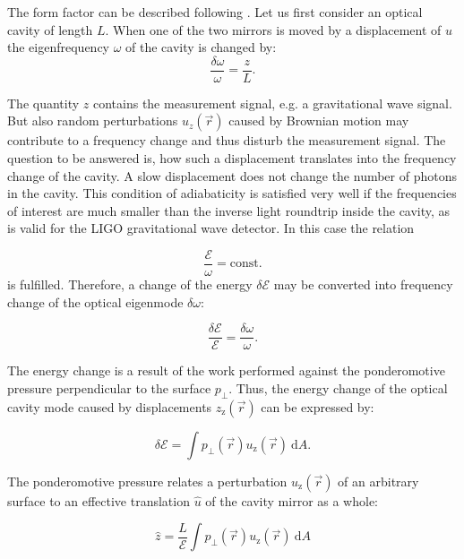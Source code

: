 \documentclass[twocolumn,secnumarabic,amssymb, nobibnotes, aps, prd, showpacs]{revtex4-1}
\begin{document}
\noindent The form factor can be described following \cite{Dem2015, Tug2017}. Let us first consider an optical cavity of length $L$. When one of the two mirrors is moved by a displacement of $u$ the eigenfrequency $\omega$ of the cavity is changed by: 
\begin{equation}
\frac{\delta \omega}{\omega}=\frac{z}{L}.
\end{equation}

\noindent The quantity $z$ contains the measurement signal, e.g. a gravitational wave signal. But also random perturbations $u_z(\vec{r})$ caused by Brownian motion may contribute to a frequency change and thus disturb the measurement signal. The question to be answered is, how such a displacement translates into the frequency change of the cavity. A slow displacement does not change the number of photons in the cavity. This condition of adiabaticity is satisfied very well if the frequencies of interest are much smaller than the inverse light roundtrip inside the cavity, as is valid for the LIGO gravitational wave detector. In this case the relation


\begin{equation}
\frac{\mathcal{E}}{\omega}=\mathrm{const.}
\end{equation}
is fulfilled. Therefore, a change of the energy $\delta\mathcal{E}$ may be converted into frequency change of the optical eigenmode $\delta\omega$:

\begin{equation}
\frac{\delta \mathcal{E}}{\mathcal{E}}=\frac{\delta \omega}{\omega}.
\end{equation}

\noindent The energy change is a result of the work performed against the ponderomotive pressure perpendicular to the surface $p_{\perp}$. Thus, the energy change of the optical cavity mode caused by displacements $z_\mathrm{z}(\vec{r})$ can be expressed by:

\begin{equation}
\delta\mathcal{E}=\int p_\perp(\vec{r}) u_\mathrm{z}(\vec{r})\ \mathrm{d}A.
\end{equation}

\noindent The ponderomotive pressure relates a perturbation $u_\mathrm{z}(\vec{r})$ of an arbitrary surface to an effective translation $\hat{u}$ of the cavity mirror as a whole:

\begin{equation}
\hat{z} = \frac{L}{\mathcal{E}}\int p_\perp(\vec{r}) u_\mathrm{z}(\vec{r})\ \mathrm{d}A
\label{Eq:zhat}
\end{equation}
\end{document}
